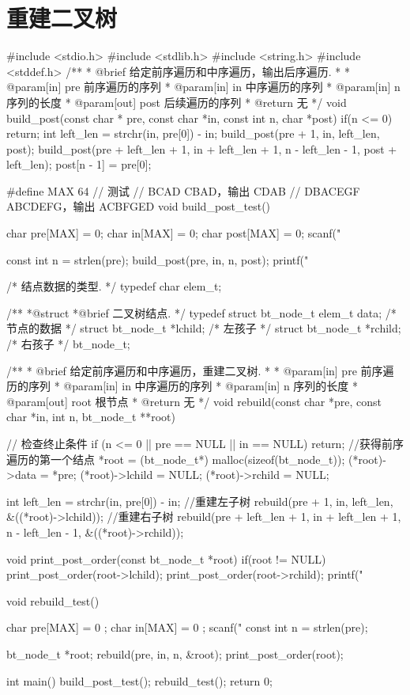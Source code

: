 \section{重建二叉树} %
\begin{Codex}[label=binary_tree_rebuild.c]
#include <stdio.h>
#include <stdlib.h>
#include <string.h>
#include <stddef.h>
/**
 * @brief 给定前序遍历和中序遍历，输出后序遍历.
 *
 * @param[in] pre 前序遍历的序列
 * @param[in] in 中序遍历的序列
 * @param[in] n 序列的长度
 * @param[out] post 后续遍历的序列
 * @return 无
 */
void build_post(const char * pre, const char *in, const int n, char *post) {
    if(n <= 0) return;
    int left_len = strchr(in, pre[0]) - in;
    build_post(pre + 1, in, left_len, post);
    build_post(pre + left_len + 1, in + left_len + 1,
            n - left_len - 1, post + left_len);
    post[n - 1] = pre[0];
}

#define MAX  64
// 测试
// BCAD CBAD，输出 CDAB
// DBACEGF ABCDEFG，输出 ACBFGED
void build_post_test() {
    char pre[MAX] = {0};
    char in[MAX] = {0};
    char post[MAX] = {0};
    scanf("%

    const int n = strlen(pre);
    build_post(pre, in, n, post);
    printf("%
}

/* 结点数据的类型. */
typedef char elem_t;

/**
 *@struct
 *@brief 二叉树结点.
 */
typedef struct bt_node_t {
    elem_t data; /* 节点的数据 */
    struct bt_node_t *lchild; /* 左孩子 */
    struct bt_node_t *rchild; /* 右孩子 */
} bt_node_t;

/**
 * @brief 给定前序遍历和中序遍历，重建二叉树.
 *
 * @param[in] pre 前序遍历的序列
 * @param[in] in 中序遍历的序列
 * @param[in] n 序列的长度
 * @param[out] root 根节点
 * @return 无
 */
void rebuild(const char *pre, const char *in, int n, bt_node_t **root) {
    // 检查终止条件
    if (n <= 0 || pre == NULL || in == NULL)
        return;
    //获得前序遍历的第一个结点
    *root = (bt_node_t*) malloc(sizeof(bt_node_t));
    (*root)->data = *pre;
    (*root)->lchild = NULL;
    (*root)->rchild = NULL;

    int left_len = strchr(in, pre[0]) - in;
    //重建左子树
    rebuild(pre + 1, in, left_len, &((*root)->lchild));
    //重建右子树
    rebuild(pre + left_len + 1, in + left_len + 1, n - left_len - 1,
            &((*root)->rchild));
}

void print_post_order(const bt_node_t *root) {
    if(root != NULL) {
        print_post_order(root->lchild);
        print_post_order(root->rchild);
        printf("%
    }
}

void rebuild_test() {
    char pre[MAX] = { 0 };
    char in[MAX] = { 0 };
    scanf("%
    const int n = strlen(pre);

    bt_node_t *root;
    rebuild(pre, in, n, &root);
    print_post_order(root);
}

int main() {
    build_post_test();
    rebuild_test();
    return 0;
}
\end{Codex}


